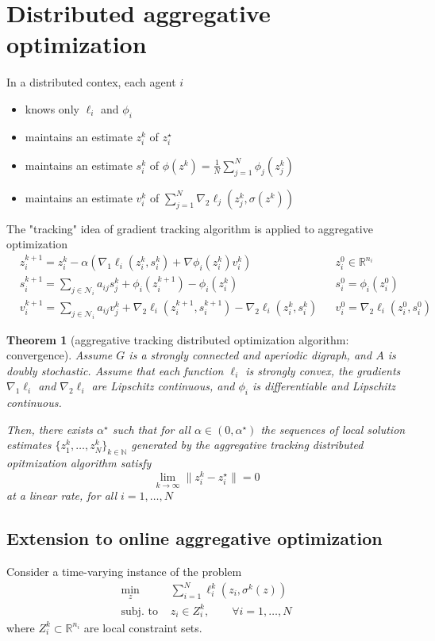 \documentclass{book}
\newcommand{\R}{\mathbb{R}}
\newcommand{\N}{\mathbb{N}}
\theoremstyle{theoremv2}
\newtheorem{theorem}{Theorem}[chapter]
\theoremstyle{defv2}
\theoremstyle{remark}
\theoremstyle{remark}
\theoremstyle{definition}
\theoremstyle{definition}
\begin{document}
\section{Distributed aggregative optimization}
In a distributed contex, each agent $i$ 
\begin{itemize}
    \item knows only $\ell_i$ and $\phi_i$
        \item maintains an estimate $z_i^k$ of $z_i^\star$
        \item maintains an estimate $s_i^k$ of $\phi(z^k) = \displaystyle\frac{1}{N}\displaystyle\sum_{j=1}^{N}\phi_j(z_j^k)$
        \item maintains an estimate $v_i^k$ of $\displaystyle\sum_{j=1}^{N}\nabla_2 \ell_j(z_j^k,\sigma(z^k))$
\end{itemize}
The "tracking" idea of gradient tracking algorithm is applied to aggregative optimization
\begin{align*}
    & z_i^{k+1} = z_i^k - \alpha\left( \nabla_1\ell_i(z_i^k,s_i^k) + \nabla \phi_i(z_i^k)v_i^k \right) && z_i^0 \in\R^{n_i}\\
    & s_i^{k+1} = \displaystyle\sum_{j\in\mathcal{N}_i}a_{ij}s_j^k + \phi_i(z_i^{k+1})-\phi_i(z_i^k) && s_i^0 = \phi_i(z_i^0)\\
    & v_i^{k+1} = \displaystyle\sum_{j\in\mathcal{N}_i}a_{ij}v_j^k + \nabla_2\ell_i(z_i^{k+1},s_i^{k+1})-\nabla_2\ell_i (z_i^k,s_i^k) && v_i^0 = \nabla_2\ell_i(z_i^0,s_i^0)
\end{align*}
\begin{theorem}[aggregative tracking distributed optimization algorithm: convergence]
    Assume $G$ is a strongly connected and aperiodic digraph, and $A$ is doubly stochastic. Assume that each function $\ell_i$ is strongly convex, the gradients $\nabla_1\ell_i$ and $\nabla_2\ell_i$ are Lipschitz continuous, and $\phi_i$ is differentiable and Lipschitz continuous. 

    Then, there exists $\alpha^\star$ such that for all $\alpha\in(0,\alpha^\star)$ the sequences of local solution estimates $\{ z_1^k,\dots,z_N^k \}_{k\in\N}$ generated by the aggregative tracking distributed opitmization algorithm satisfy 
    \[
        \lim_{k\to\infty}\|z_i^k-z_i^\star\| = 0
    \]
    at a linear rate, for all $i=1,\dots,N$
\end{theorem}
\subsection{Extension to online aggregative optimization}
Consider a time-varying instance of the problem 
\begin{align*}
    \min_{z} & \displaystyle\sum_{i=1}^{N}\ell_i^k(z_i,\sigma^k(z))\\
    \text{subj. to }& z_i\in Z_i^k, \qquad \forall i=1,\dots,N
\end{align*}
where $Z_i^k\subset \R^{n_i}$ are local constraint sets.
\end{document}
